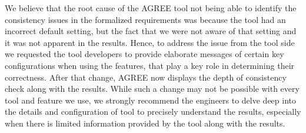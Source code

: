 We believe that the root cause of the AGREE tool not being able to identify the consistency issues in the formalized requirements was because the tool had an incorrect default setting, but the fact that we were not aware of that setting and it was not apparent in the results. Hence, to address the issue from the tool side we requested the tool developers to provide elaborate messages of certain key configurations when using the features, that play a key role in determining their correctness. After that change, AGREE now displays the depth of consistency check along with the results. While such a change may not be possible with every tool and feature we use, we strongly recommend the engineers to delve deep into the details and configuration of tool to precisely understand the results, especially when there is limited information provided by the tool along with the results. %




%
%
%
